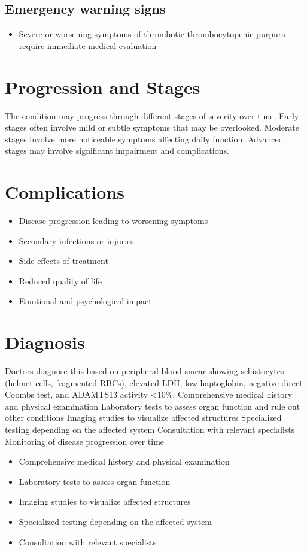 \subsection{Emergency warning signs}
\begin{itemize}[noitemsep]
  \item Severe or worsening symptoms of thrombotic thrombocytopenic purpura require immediate medical evaluation
\end{itemize}
\section{Progression and Stages}
The condition may progress through different stages of severity over time. Early stages often involve mild or subtle symptoms that may be overlooked. Moderate stages involve more noticeable symptoms affecting daily function. Advanced stages may involve significant impairment and complications.
\section{Complications}
\begin{itemize}[noitemsep]
  \item Disease progression leading to worsening symptoms
  \item Secondary infections or injuries
  \item Side effects of treatment
  \item Reduced quality of life
  \item Emotional and psychological impact
\end{itemize}
\section{Diagnosis}
Doctors diagnose this based on peripheral blood smear showing schistocytes (helmet cells, fragmented RBCs), elevated LDH, low haptoglobin, negative direct Coombs test, and ADAMTS13 activity <10\%. Comprehensive medical history and physical examination Laboratory tests to assess organ function and rule out other conditions Imaging studies to visualize affected structures Specialized testing depending on the affected system Consultation with relevant specialists Monitoring of disease progression over time

\begin{itemize}[noitemsep]
  \item Comprehensive medical history and physical examination
  \item Laboratory tests to assess organ function
  \item Imaging studies to visualize affected structures
  \item Specialized testing depending on the affected system
  \item Consultation with relevant specialists
\end{itemize}
